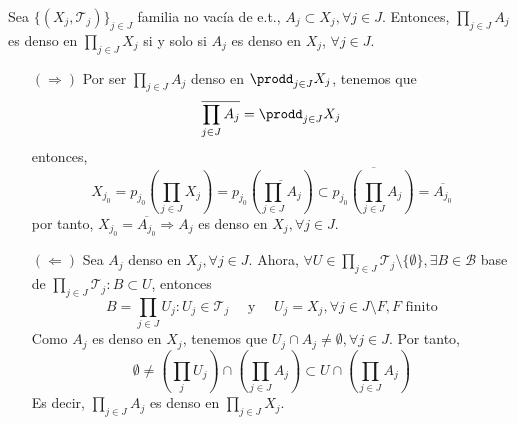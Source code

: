 \begin{ejr}[35]
  Sea $\{ ( X_{j}, \mathcal{T}_{j} ) \}_{j \in J}$ familia no vacía de e.t., $A_{j} \subset X_{j}, \forall j \in J$. Entonces, $\prod_{j \in J} A_{j}$ es denso en $\prod_{j \in J} X_{j}$ si y solo si $A_{j}$ es denso en $X_{j}$, $\forall j \in J$.
\end{ejr}

\begin{sol}
  \begin{enumerate}[label=(\roman*)]
    \item []
    \item [$(\Rightarrow)$] Por ser $\prod_{j \in J} A_{j}$ denso en $\prodd_{j \in J} X_{j}$, tenemos que
      \[ 
        \overline{\prod_{j \in J} A_{j}} = \prodd_{j \in J} X_{j}
      \] 
      entonces,
      \[ 
        X_{j_{0}} = p_{j_{0}}(\prod_{j \in J} X_{j}) = p_{j_{0}}(\overline{\prod_{j \in J} A_{j}}) \subset \overline{p_{j_{0}}(\prod_{j \in J} A_{j})} = \overline{A_{j_{0}}}
      \] 
      por tanto, $X_{j_{0}} = \overline{A_{j_{0}}} \Rightarrow A_{j}$ es denso en $X_{j}, \forall j \in J$.

    \item [$(\Leftarrow)$] Sea $A_{j}$ denso en $X_{j}, \forall j \in J$. Ahora, $\forall U \in \prod_{j \in J} \mathcal{T}_{j} \setminus \{ \emptyset \}, \exists B \in \mathcal{B}$ base de $\prod_{j \in J} \mathcal{T}_{j}: B \subset U$, entonces
      \[ 
        B = \prod_{j \in J} U_{j} : U_{j} \in \mathcal{T}_{j} \quad \text{ y } \quad U_{j} = X_{j}, \forall j \in J \setminus F, F \text{ finito}
      \] 
      Como $A_{j}$ es denso en $X_{j}$, tenemos que $U_{j} \cap A_{j} \neq \emptyset, \forall j \in J$. Por tanto,
      \[ 
        \emptyset \neq (\prod_{j} U_{j}) \cap (\prod_{j \in J} A_{j}) \subset U \cap (\prod_{j \in J} A_{j})
      \] 
      Es decir, $\prod_{j \in J} A_{j}$ es denso en $\prod_{j \in J} X_{j}$.
  \end{enumerate}
\end{sol}
